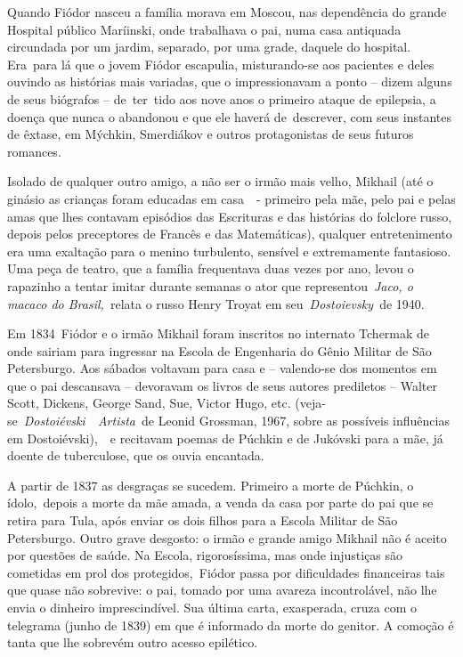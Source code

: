 Quando Fiódor nasceu a família morava em Moscou, nas dependência do
grande Hospital público Maríinski, onde trabalhava o pai, numa casa
antiquada circundada por um jardim, separado, por uma grade, daquele do
hospital. Era~para lá que o jovem Fiódor escapulia, misturando-se aos
pacientes e deles ouvindo as histórias mais variadas, que o
impressionavam a ponto -- dizem alguns de seus biógrafos -- de~ter~tido
aos nove anos o primeiro ataque de epilepsia, a doença que nunca o
abandonou e que ele haverá de~descrever, com seus instantes de êxtase,
em Mýchkin, Smerdiákov e outros protagonistas de seus futuros romances.

Isolado de qualquer outro amigo, a não ser o irmão mais velho, Mikhail
(até o ginásio as crianças foram educadas em casa~~- primeiro pela mãe,
pelo pai e pelas amas que lhes contavam episódios das Escrituras e das
histórias do folclore russo, depois pelos preceptores de Francês e das
Matemáticas), qualquer entretenimento era uma exaltação para o menino
turbulento, sensível e extremamente fantasioso. Uma peça de teatro, que
a família frequentava duas vezes por ano, levou o rapazinho a tentar
imitar durante semanas o ator que representou~\emph{Jaco, o macaco do
Brasil,~}relata o russo Henry Troyat em seu~\emph{Dostoievsky~}de 1940.

Em 1834~Fiódor e o irmão Mikhail foram inscritos no internato Tchermak
de onde sairiam para ingressar na Escola de Engenharia do Gênio Militar
de São Petersburgo. Aos sábados voltavam para casa e -- valendo-se dos
momentos em que o pai descansava -- devoravam os livros de seus autores
prediletos -- Walter Scott, Dickens, George Sand, Sue, Victor Hugo, etc.
(veja-se~\emph{Dostoiévski~~Artista}~de Leonid Grossman, 1967, sobre as
possíveis influências em Dostoiévski),~~e recitavam poemas de Púchkin e
de Jukóvski para a mãe, já doente de tuberculose, que os ouvia
encantada.

A partir de 1837 as desgraças se sucedem. Primeiro a morte de Púchkin, o
ídolo,~depois a morte da mãe amada, a venda da casa por parte do pai que
se retira para Tula, após enviar os dois filhos para a Escola Militar de
São Petersburgo. Outro grave desgosto: o irmão e grande amigo Mikhail
não é aceito por questões de saúde. Na Escola, rigorosíssima, mas onde
injustiças são cometidas em prol dos protegidos,~Fiódor passa por
dificuldades financeiras tais que quase não sobrevive: o pai, tomado por
uma avareza incontrolável, não lhe envia o dinheiro imprescindível. Sua
última carta, exasperada, cruza com o telegrama (junho de 1839) em que é
informado da morte do genitor. A comoção é tanta que lhe sobrevém outro
acesso epilético.

